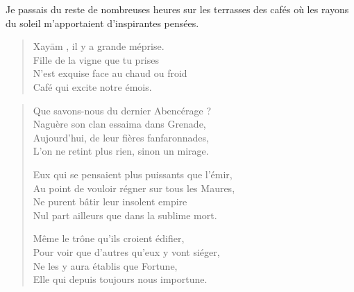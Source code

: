 \begin{prose}
  Je passais du reste de nombreuses heures sur les terrasses des cafés où les rayons du soleil m’apportaient d’inspirantes pensées.
\end{prose}

%
\begin{verse}\quatrain
  Xayām%
  ,\label{foot.xayam} il y a grande méprise.\\  %
  Fille de la vigne que tu prises\\ 
  N’est exquise face au chaud ou froid\\ 
  Café qui excite notre émois.  %
\end{verse}

\begin{verse}\quatrain
  Que savons-nous du dernier Abencérage%
\label{foot.Abencerage} ?\\  %
  Naguère son clan essaima dans Grenade,\\ 
  Aujourd’hui, de leur fières fanfaronnades,\\ 
  L’on ne retint plus rien, sinon un mirage.  %

  Eux qui se pensaient plus puissants que l’émir,\\ 
  Au point de vouloir régner sur tous les Maures,\\ 
  Ne purent bâtir leur insolent empire\\ 
  Nul part ailleurs que dans la sublime mort.  %

  Même le trône qu’ils croient édifier,\\ 
  Pour voir que d’autres qu’eux y vont siéger,\\ 
  Ne les y aura établis que Fortune,\\ 
  Elle qui depuis toujours nous importune.  %
\end{verse}

